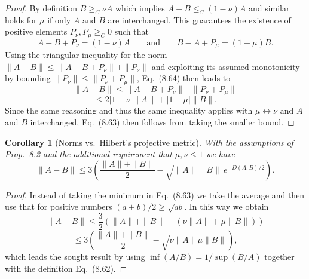 \documentclass[11pt,a4paper]{article}
\theoremstyle{plain}
\newtheorem{corollary}{Corollary}[section]
\theoremstyle{definition}
\theoremstyle{remark}
\begin{document}
\begin{proof}
    By definition $B\ge_C \nu A$ which implies $A-B\le_C (1-\nu)A$ and similar holds for $\mu$ if only $A$ and $B$ are interchanged.
    This guarantees the existence of positive elements $P_\nu,P_\mu\ge_C 0$ such that
    \begin{equation}\tag{8.64}
        A-B+P_\nu = (1-\nu)A
        \qquad\text{and}\qquad
        B-A+P_\mu = (1-\mu)B.
    \end{equation}
    Using the triangular inequality for the norm $\|A-B\|\le \|A-B+P_\nu\|+\|P_\nu\|$ and exploiting its assumed monotonicity by bounding
    $\|P_\nu\|\le \|P_\nu+P_\mu\|$, Eq.~(8.64) then leads to
    \begin{equation}\tag{8.65}
        \|A-B\| \le \|A-B+P_\nu\| + \|P_\nu+P_\mu\|
    \end{equation}
    \begin{equation}\tag{8.66}
        \le 2|1-\nu| \|A\| + |1-\mu| \|B\|.
    \end{equation}
    Since the same reasoning and thus the same inequality applies with $\mu\leftrightarrow\nu$ and $A$ and $B$ interchanged, Eq.~(8.63) then follows
    from taking the smaller bound.
\end{proof}

\begin{corollary}[Norms vs.\ Hilbert's projective metric]
    With the assumptions of Prop.~8.2 and the additional requirement that $\mu,\nu\le 1$ we have
    \begin{equation}\tag{8.67}
        \|A-B\| \le 3\left(\frac{\|A\|+\|B\|}{2} - \sqrt{\|A\| \|B\|}\,e^{-D(A,B)/2}\right).
    \end{equation}
\end{corollary}

\begin{proof}
    Instead of taking the minimum in Eq.~(8.63) we take the average and then use that for positive numbers $(a+b)/2\ge \sqrt{ab}$.
    In this way we obtain
    \begin{equation}\tag{8.68}
        \|A-B\| \le \frac{3}{2}\left(\|A\|+\|B\|-(\nu\|A\|+\mu\|B\|)\right)
    \end{equation}
    \begin{equation}\tag{8.69}
        \le 3\left(\frac{\|A\|+\|B\|}{2}-\sqrt{\nu\|A\| \mu\|B\|}\right),
    \end{equation}
    which leads the sought result by using $\inf(A/B)=1/\sup(B/A)$ together with the definition Eq.~(8.62).
\end{proof}
\end{document}
